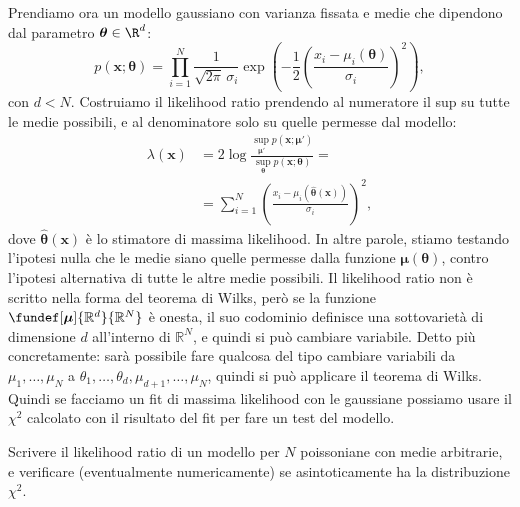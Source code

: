 Prendiamo ora un modello gaussiano con varianza fissata e medie che dipendono
dal parametro $\boldsymbol\theta\in\R^d$:
%
\begin{equation*}
	p(\mathbf x;\boldsymbol\theta)
	= \prod_{i=1}^N \frac1{\sqrt{2\pi}\,\sigma_i}
	\exp\left(-\frac12\left(\frac{x_i-\mu_i(\boldsymbol\theta)}{\sigma_i}\right)^2\right),
\end{equation*}
%
con $d < N$. Costruiamo il likelihood ratio prendendo al numeratore il
sup su tutte le medie possibili, e al denominatore solo su quelle permesse
dal modello:
%
\begin{align*}
    \lambda(\mathbf x)
    &= 2\log \frac
    {\sup_{\boldsymbol\mu'} p(\mathbf x; \boldsymbol\mu')}
    {\sup_{\boldsymbol\theta} p(\mathbf x; \boldsymbol\theta)} = \\
    &= \sum_{i=1}^N \left(
    \frac {x_i-\mu_i(\hat{\boldsymbol\theta}(\mathbf x))} {\sigma_i}
    \right)^2,
\end{align*}
%
dove $\hat{\boldsymbol\theta}(\mathbf x)$ è lo stimatore di massima likelihood.
%
In altre parole, stiamo testando l'ipotesi nulla che le medie siano quelle
permesse dalla funzione $\boldsymbol\mu(\boldsymbol\theta)$, contro l'ipotesi
alternativa di tutte le altre medie possibili. Il likelihood ratio non è
scritto nella forma del teorema di Wilks, però se la funzione
$\fundef[\boldsymbol\mu]{\mathbb R^d}{\mathbb R^N}$ è onesta, il suo codominio
definisce una sottovarietà di dimensione $d$ all'interno di $\mathbb R^N$, e
quindi si può cambiare variabile. Detto più concretamente: sarà possibile fare
qualcosa del tipo cambiare variabili da $\mu_1,\ldots,\mu_N$ a
$\theta_1,\ldots,\theta_d,\mu_{d+1},\ldots,\mu_N$, quindi si può applicare il
teorema di Wilks.
%
Quindi se facciamo un fit di massima likelihood con le gaussiane possiamo
usare il $\chi^2$ calcolato con il risultato del fit per fare un test del
modello.

\begin{exercise}
	Scrivere il likelihood ratio di un modello per $N$ poissoniane con medie arbitrarie,
	e verificare (eventualmente numericamente) se asintoticamente ha la distribuzione $\chi^2$.
\end{exercise}
